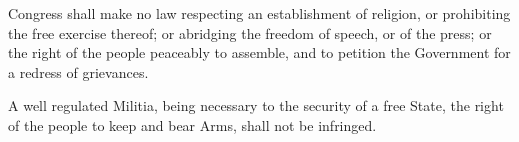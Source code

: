 
\par Congress shall make no law respecting an establishment of religion, or prohibiting the free exercise thereof; or abridging the freedom of speech, or of the press; or the right of the people peaceably to assemble, and to petition the Government for a redress of grievances. 
\par A well regulated Militia, being necessary to the security of a free State, the right of the people to keep and bear Arms, shall not be infringed. 